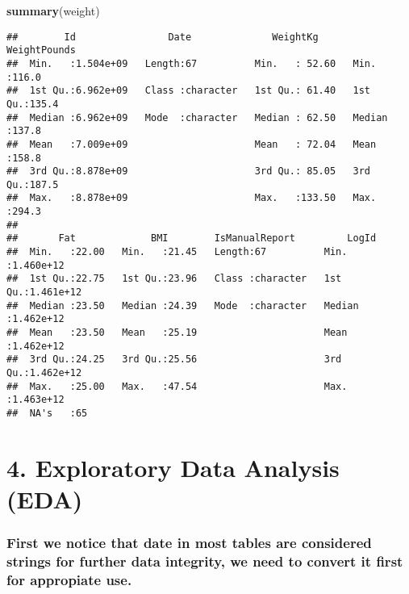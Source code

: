 \documentclass[
]{article}
\newenvironment{Shaded}{\begin{snugshade}}{\end{snugshade}}
\newcommand{\FunctionTok}[1]{\textcolor[rgb]{0.13,0.29,0.53}{\textbf{#1}}}
\newcommand{\NormalTok}[1]{#1}
\begin{document}
\begin{Shaded}
\begin{Highlighting}[]
\FunctionTok{summary}\NormalTok{(weight)}
\end{Highlighting}
\end{Shaded}

\begin{verbatim}
##        Id                Date              WeightKg       WeightPounds  
##  Min.   :1.504e+09   Length:67          Min.   : 52.60   Min.   :116.0  
##  1st Qu.:6.962e+09   Class :character   1st Qu.: 61.40   1st Qu.:135.4  
##  Median :6.962e+09   Mode  :character   Median : 62.50   Median :137.8  
##  Mean   :7.009e+09                      Mean   : 72.04   Mean   :158.8  
##  3rd Qu.:8.878e+09                      3rd Qu.: 85.05   3rd Qu.:187.5  
##  Max.   :8.878e+09                      Max.   :133.50   Max.   :294.3  
##                                                                         
##       Fat             BMI        IsManualReport         LogId          
##  Min.   :22.00   Min.   :21.45   Length:67          Min.   :1.460e+12  
##  1st Qu.:22.75   1st Qu.:23.96   Class :character   1st Qu.:1.461e+12  
##  Median :23.50   Median :24.39   Mode  :character   Median :1.462e+12  
##  Mean   :23.50   Mean   :25.19                      Mean   :1.462e+12  
##  3rd Qu.:24.25   3rd Qu.:25.56                      3rd Qu.:1.462e+12  
##  Max.   :25.00   Max.   :47.54                      Max.   :1.463e+12  
##  NA's   :65
\end{verbatim}

\section{4. Exploratory Data Analysis
(EDA)}\label{exploratory-data-analysis-eda}

\subsubsection{First we notice that date in most tables are considered
strings for further data integrity, we need to convert it first for
appropiate
use.}\label{first-we-notice-that-date-in-most-tables-are-considered-strings-for-further-data-integrity-we-need-to-convert-it-first-for-appropiate-use.}
\end{document}
